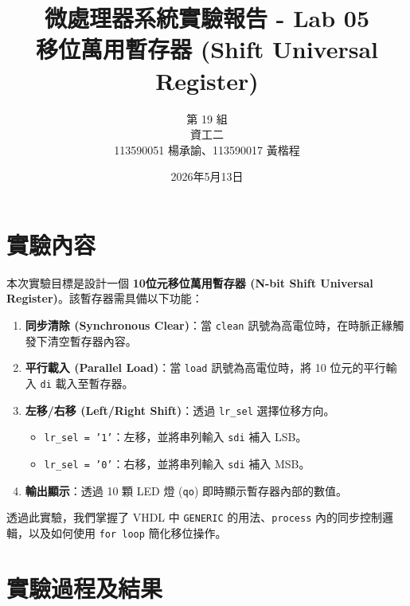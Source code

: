 \documentclass[12pt, a4paper]{article}
\title{微處理器系統實驗報告 - Lab 05 \\ \Large 移位萬用暫存器 (Shift Universal Register)}
\author{第 19 組 \\ 資工二 \\ 113590051 楊承諭、113590017 黃楷程}
\date{2026年5月13日}
\begin{document}
\maketitle
\newpage

\section{實驗內容}
本次實驗目標是設計一個 \textbf{10位元移位萬用暫存器 (N-bit Shift Universal Register)}。該暫存器需具備以下功能：
\begin{enumerate}
    \item \textbf{同步清除 (Synchronous Clear)}：當 \texttt{clean} 訊號為高電位時，在時脈正緣觸發下清空暫存器內容。
    \item \textbf{平行載入 (Parallel Load)}：當 \texttt{load} 訊號為高電位時，將 10 位元的平行輸入 \texttt{di} 載入至暫存器。
    \item \textbf{左移/右移 (Left/Right Shift)}：透過 \texttt{lr\_sel} 選擇位移方向。
    \begin{itemize}
        \item \texttt{lr\_sel = '1'}：左移，並將串列輸入 \texttt{sdi} 補入 LSB。
        \item \texttt{lr\_sel = '0'}：右移，並將串列輸入 \texttt{sdi} 補入 MSB。
    \end{itemize}
    \item \textbf{輸出顯示}：透過 10 顆 LED 燈 (\texttt{qo}) 即時顯示暫存器內部的數值。
\end{enumerate}

透過此實驗，我們掌握了 VHDL 中 \texttt{GENERIC} 的用法、\texttt{process} 內的同步控制邏輯，以及如何使用 \texttt{for loop} 簡化移位操作。

\section{實驗過程及結果}
\end{document}
